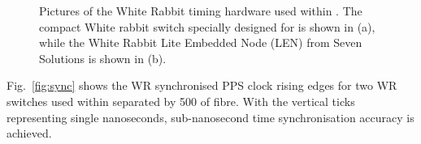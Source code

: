 \begin{figure} %
    \centering
    \quad
    \caption[Pictures of the White Rabbit timing hardware used within \chipsfive.]
    {Pictures of the White Rabbit timing hardware used within \chipsfive. The compact White rabbit
        switch specially designed for \chips is shown in (a), while the White Rabbit Lite Embedded
        Node (LEN) from Seven Solutions is shown in (b).}
    \label{fig:wr_electronics}
\end{figure}

Fig.~\ref{fig:sync} shows the WR synchronised PPS clock rising edges for two WR switches used
within \chipsfive separated by \unit{500}{} of fibre. With the vertical ticks
representing single nanoseconds, sub-nanosecond time synchronisation accuracy is achieved.

